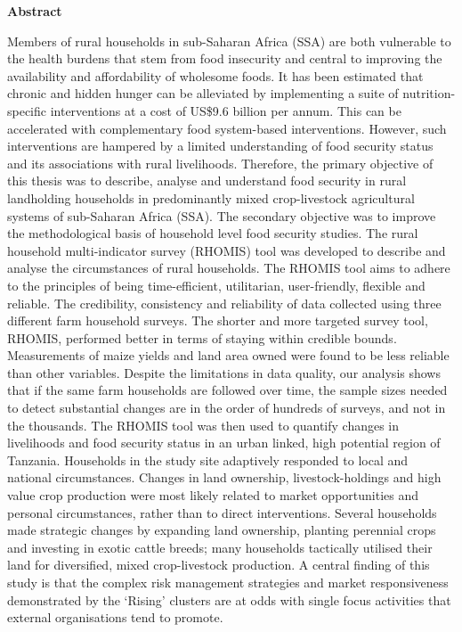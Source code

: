\thispagestyle{empty}

\textbf{Abstract}

\small
Members of rural households in sub-Saharan Africa (SSA) are both vulnerable to the health burdens that stem from food insecurity and central to improving the availability and affordability of wholesome foods. It has been estimated that chronic and hidden hunger can be alleviated by implementing a suite of nutrition-specific interventions at a cost of US\$9.6 billion per annum. This can be accelerated with complementary food system-based interventions. However, such interventions are hampered by a limited understanding of food security status and its associations with rural livelihoods. Therefore, the primary objective of this thesis was to describe, analyse and understand food security in rural landholding households in predominantly mixed crop-livestock agricultural systems of sub-Saharan Africa (SSA). The secondary objective was to improve the methodological basis of household level food security studies.
The rural household multi-indicator survey (RHOMIS) tool was developed to describe and analyse the circumstances of rural households. The RHOMIS tool aims to adhere to the principles of being time-efficient, utilitarian, user-friendly, flexible and reliable. The credibility, consistency and reliability of data collected using three different farm household surveys. The shorter and more targeted survey tool, RHOMIS, performed better in terms of staying within credible bounds. Measurements of maize yields and land area owned were found to be less reliable than other variables. Despite the limitations in data quality, our analysis shows that if the same farm households are followed over time, the sample sizes needed to detect substantial changes are in the order of hundreds of surveys, and not in the thousands.
The RHOMIS tool was then used to quantify changes in livelihoods and food security status in an urban linked, high potential region of Tanzania. Households in the study site adaptively responded to local and national circumstances. Changes in land ownership, livestock-holdings and high value crop production were most likely related to market opportunities and personal circumstances, rather than to direct interventions. Several households made strategic changes by expanding land ownership, planting perennial crops and investing in exotic cattle breeds; many households tactically utilised their land for diversified, mixed crop-livestock production. A central finding of this study is that the complex risk management strategies and market responsiveness demonstrated by the `Rising' clusters are at odds with single focus activities that external organisations tend to promote.
